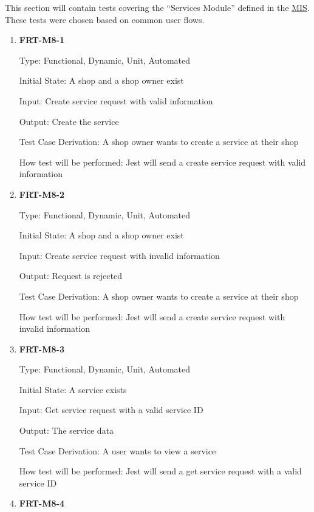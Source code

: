 \documentclass[12pt, titlepage]{article}
\begin{document}
This section will contain tests covering the ``Services Module'' defined in the
\href{https://github.com/arkinmodi/project-sayyara/blob/main/docs/Design/MIS/MIS.pdf}{MIS}. These
tests were chosen based on common user flows.

\begin{enumerate}

	\item \textbf{FRT-M8-1}

	      Type: Functional, Dynamic, Unit, Automated

	      Initial State: A shop and a shop owner exist

	      Input: Create service request with valid information

	      Output: Create the service

	      Test Case Derivation: A shop owner wants to create a service at their shop

	      How test will be performed: Jest will send a create service request with valid information

	\item \textbf{FRT-M8-2}

	      Type: Functional, Dynamic, Unit, Automated

	      Initial State: A shop and a shop owner exist

	      Input: Create service request with invalid information

	      Output: Request is rejected

	      Test Case Derivation: A shop owner wants to create a service at their shop

	      How test will be performed: Jest will send a create service request with invalid information

	\item \textbf{FRT-M8-3}

	      Type: Functional, Dynamic, Unit, Automated

	      Initial State: A service exists

	      Input: Get service request with a valid service ID

	      Output: The service data

	      Test Case Derivation: A user wants to view a service

	      How test will be performed: Jest will send a get service request with a valid service ID

	\item \textbf{FRT-M8-4}


\end{enumerate}
\end{document}
